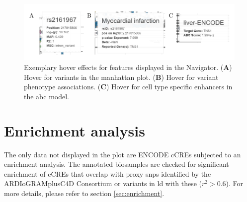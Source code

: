     \begin{figure}[h!]
    \capstart
        \centering
        \includegraphics{Abbildung/GWAS_navigator_hover.pdf}

        \begin{minipage}{\captionwidth}
            \caption[database]{\newline
            Exemplary hover effects for features displayed in the  Navigator. (\textbf{A}) Hover for variants in the manhattan plot. (\textbf{B}) Hover for variant phenotype associations. (\textbf{C}) Hover for cell type specific enhancers in the \ac{abc} model.}
            \label{fig:GWAS_navigator_hover}
        \end{minipage}
    \end{figure}

\section{Enrichment analysis}
\label{sec:result_enrichment}
The only data not displayed in the plot are ENCODE \acp{cCRE} subjected to an enrichment analysis. The annotated biosamples are checked for significant enrichment of \acp{cCRE} that overlap with proxy \acp{snp} identified by the ARDIoGRAMplusC4D Consortium \cite{aragamDiscoverySystematicCharacterization2021s} or variants in \ac{ld} with these ($r^2 > 0.6$). For more details, please refer to section \ref{sec:enrichment}.

